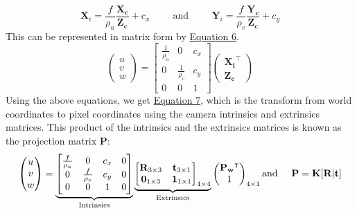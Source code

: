 \begin{enumerate}
\begin{equation}
    \mathbf{X}_i = \frac{f}{\rho_u}\frac{\mathbf{X_c}}{\mathbf{Z_c}} + c_x\hspace{1cm} \text{and} \hspace{1cm}\mathbf{Y}_i = \frac{f}{\rho_v}\frac{\mathbf{Y_c}}{\mathbf{Z_c}} + c_y
\end{equation}\label{eq:pix-from-img}
This can be represented in matrix form by \hyperref[eq:pix-from-img-matrix]{Equation 6}.
\begin{equation}
    \begin{pmatrix}
            u\\
            v\\
            w
        \end{pmatrix}
        = 
        \begin{bmatrix}
            \frac{1}{\rho_u} & 0 & c_x \\
            0 & \frac{1}{\rho_v} & c_y \\
            0 & 0 & 1 
        \end{bmatrix}
        \begin{pmatrix}
            \mathbf{X_i}^\intercal \\
            \mathbf{Z_c}
        \end{pmatrix}
\end{equation}\label{eq:pix-from-img-matrix}
Using the above equations, we get \hyperref[eq:world-to-pix]{Equation 7}, which is the transform from world coordinates to pixel coordinates using the camera intrinsics and extrinsics matrices. This product of the intrinsics and the extrinsics matrices is known as the projection matrix $\mathbf{P}$:
\begin{equation}
    \begin{pmatrix}
        u\\
        v\\
        w
    \end{pmatrix}
=   \underbrace{\begin{bmatrix}
        \frac{f}{\rho_u} & 0 & c_x &0 \\
        0 & \frac{f}{\rho_v} & c_y &0\\
        0 & 0 & 1 &0
    \end{bmatrix}}_\text{Intrinsics} 
            \underbrace{\begin{bmatrix}
            \mathbf{R}_{3\times3} & \mathbf{t}_{3\times1}\\
            \mathbf{0}_{1\times3} & \mathbf{1}_{1\times1}
        \end{bmatrix}_{4\times4}}_\text{Extrinsics}
        \begin{pmatrix}
            \mathbf{P_w}^\intercal \\
            1
        \end{pmatrix}_{4\times1} 
        \text{and} \hspace{5mm}\mathbf{P}=\mathbf{K[R|t]}
\end{equation}\label{eq:world-to-pix}
\end{enumerate}


